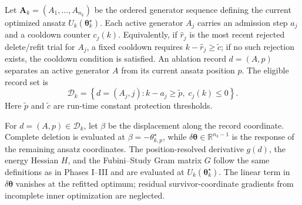 \documentclass[
  reprint,
  amsmath,
  amssymb,
  aps,
  pra,
  nofootinbib,
  superscriptaddress,
  floatfix
]{revtex4-2}
\begin{document}
Let \(\mathbf A_k=(A_1,\ldots,A_{n_k})\) be the ordered generator sequence
defining the current optimized ansatz \(U_k(\boldsymbol\theta_k^\star)\).
Each active generator \(A_j\) carries an admission step \(a_j\) and a cooldown
counter \(c_j(k)\). Equivalently, if \(\hat r_j\) is the most recent rejected
delete/refit trial for \(A_j\), a fixed cooldown requires
\(k-\hat r_j\ge\tilde c\); if no such rejection exists, the cooldown condition
is satisfied. An ablation record \(d=(A,p)\) separates an active generator
\(A\) from its current ansatz position \(p\). The eligible record set is
\begin{equation*}
\mathcal D_k
=
\left\{
d=(A_j,j)
:
k-a_j\ge \tilde p,\;
c_j(k)\le0
\right\}.
\end{equation*}
Here \(\tilde p\) and \(\tilde c\) are run-time constant protection thresholds.

For \(d=(A,p)\in\mathcal D_k\), let \(\beta\) be the displacement along the
record coordinate. Complete deletion is evaluated at
\(\beta=-\theta_{k,p}^\star\), while
\(\delta\boldsymbol\theta\in\mathbb R^{n_k-1}\) is the response of the
remaining ansatz coordinates. The position-resolved derivative \(g(d)\), the
energy Hessian \(H\), and the Fubini--Study Gram matrix \(G\) follow the same
definitions as in Phases I--III and are evaluated at
\(U_k(\boldsymbol\theta_k^\star)\). The linear term in
\(\delta\boldsymbol\theta\) vanishes at the refitted optimum; residual
survivor-coordinate gradients from incomplete inner optimization are
neglected.
\end{document}
